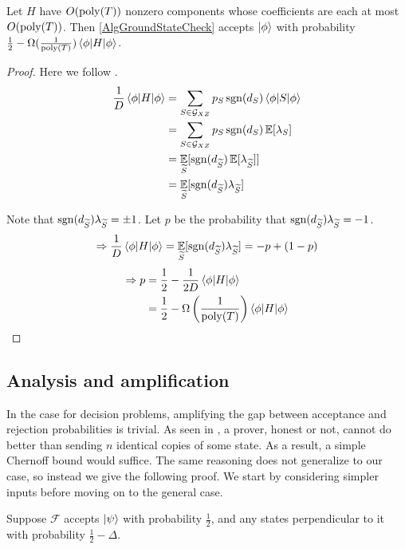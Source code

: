 \begin{theorem}\label{ThmXZCheck}
	Let $H$ have $O(\operatorname*{\operatorname{poly}}(T))$ nonzero components whose coefficients are each at most $O(\operatorname*{\operatorname{poly}}(T))$.
	Then \autoref{AlgGroundStateCheck} accepts $\ket\phi$ with probability $\frac{1}{2}-\Omega(\frac{1}{\operatorname*{\operatorname{poly}}(T)})\braket{\phi|H|\phi}$.
\end{theorem}
\begin{proof}

	Here we follow \cite{PhysRevA.93.022326}.
	\begin{align*}
		\frac{1}{D}\braket{\phi|H|\phi}&=\sum_{S\in\mathcal{G}_{XZ}} p_S\operatorname{sgn}(d_S)\braket{\phi|S|\phi}\\
		&=\sum_{S\in\mathcal{G}_{XZ}} p_S\operatorname{sgn}(d_S)\operatorname*{\mathbb{E}}[\lambda_S]\\
		&=\operatorname*{\mathbb{E}}_{\widetilde{S}}[\operatorname{sgn}(d_{\widetilde{S}})\operatorname*{\mathbb{E}}[\lambda_{\widetilde{S}}]]\\
		&=\operatorname*{\mathbb{E}}_{\widetilde{S}}[\operatorname{sgn}(d_{\widetilde{S}})\lambda_{\widetilde{S}}]
	\end{align*}

	Note that $\operatorname{sgn}(d_{\widetilde{S}})\lambda_{\widetilde{S}}=\pm1$. Let $p$ be the probability that $\operatorname{sgn}(d_{\widetilde{S}})\lambda_{\widetilde{S}}=-1$.
	$$\Rightarrow \frac{1}{D}\braket{\phi|H|\phi}=\operatorname*{\mathbb{E}}_{\widetilde{S}}[\operatorname{sgn}(d_{\widetilde{S}})\lambda_{\widetilde{S}}]=-p+(1-p)$$
	\begin{align*}
		\Rightarrow p&=\frac{1}{2}-\frac{1}{2D}\braket{\phi|H|\phi}\\
		&=\frac{1}{2}-\Omega\left(\frac{1}{\operatorname*{\operatorname{poly}}(T)}\right)\braket{\phi|H|\phi}
	\end{align*}

\end{proof}

\subsection{Analysis and amplification}

In the case for decision problems, amplifying the gap between acceptance and rejection probabilities is trivial. As seen in \cite{kitaev2002classical}, a prover, honest or not, cannot do better than sending $n$ identical copies of some state. As a result, a simple Chernoff bound would suffice. The same reasoning does not generalize to our case, so instead we give the following proof. We start by considering simpler inputs before moving on to the general case.

Suppose $\mathcal{F}$ accepts $\ket{\psi}$ with probability $\frac{1}{2}$, and any states perpendicular to it with probability $\frac{1}{2}-\Delta$.

